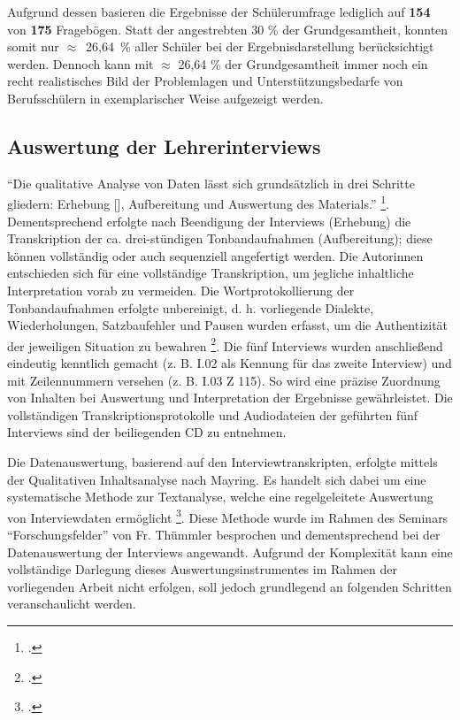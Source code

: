 Aufgrund dessen basieren die Ergebnisse der Schülerumfrage lediglich auf \textbf{154} von \textbf{175} Fragebögen. Statt der angestrebten 30 \% der Grundgesamtheit, konnten somit nur \mbox{$\approx$ 26,64 \%} aller Schüler bei der Ergebnisdarstellung berücksichtigt werden. Dennoch kann mit $\approx$ 26,64 \% der Grundgesamtheit immer noch ein recht realistisches Bild der Problemlagen und Unterstützungsbedarfe von Berufsschülern in exemplarischer Weise aufgezeigt werden.

\subsection{Auswertung der Lehrerinterviews}
\label{sec:AuswertungDerLehrerinterviews}

"`Die qualitative Analyse von Daten lässt sich grundsätzlich in drei Schritte gliedern: Erhebung [\punkte], Aufbereitung und Auswertung des Materials."' \footcite[135]{Krueger2014}. Dementsprechend erfolgte nach Beendigung der Interviews (Erhebung) die Transkription der ca. drei-stündigen Tonbandaufnahmen (Aufbereitung); diese können vollständig oder auch sequenziell angefertigt werden. Die Autorinnen entschieden sich für eine vollständige Transkription, um jegliche inhaltliche Interpretation vorab zu vermeiden. Die Wortprotokollierung der Tonbandaufnahmen erfolgte unbereinigt, d. h. vorliegende Dialekte, Wiederholungen, Satzbaufehler und Pausen wurden erfasst, um die Authentizität der jeweiligen Situation zu bewahren \footcite[vgl.][136]{Krueger2014}. Die fünf Interviews wurden anschließend eindeutig kenntlich gemacht (z. B. I.02 als Kennung für das zweite Interview) und mit Zeilennummern versehen (z. B. I.03 Z 115). So wird eine präzise Zuordnung von Inhalten bei Auswertung und Interpretation der Ergebnisse gewährleistet. Die vollständigen Transkriptionsprotokolle und Audiodateien der geführten fünf Interviews sind der beiliegenden CD zu entnehmen.

Die Datenauswertung, basierend auf den Interviewtranskripten, erfolgte mittels der Qualitativen Inhaltsanalyse nach Mayring. Es handelt sich dabei um eine systematische Methode zur Textanalyse, welche eine regelgeleitete Auswertung von Interviewdaten ermöglicht \footcite[vgl.][133]{Krueger2014}. Diese Methode wurde im Rahmen des Seminars "`Forschungsfelder"' von Fr. Thümmler besprochen und dementsprechend bei der Datenauswertung der Interviews angewandt. Aufgrund der Komplexität kann eine vollständige Darlegung dieses Auswertungsinstrumentes im Rahmen der vorliegenden Arbeit nicht erfolgen, soll jedoch grundlegend an folgenden Schritten veranschaulicht werden.

